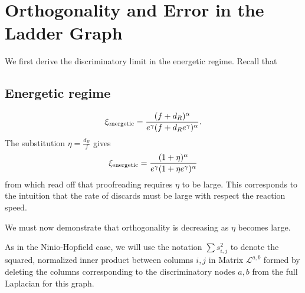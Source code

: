 \section{Orthogonality and Error in the Ladder Graph}
\label{app:ladder_orth}

We first derive the discriminatory limit in the energetic regime.  Recall that

\subsection{Energetic regime}
\[
\xi_{\rm energetic} = \frac{(f+d_R)^\alpha}{e^\gamma(f+d_Re^\gamma)^\alpha}.
\]
The substitution $\eta=\frac{d_R}{f}$ gives
\[
\xi_{\rm energetic} = \frac{(1+\eta)^\alpha}{e^\gamma(1+\eta e^\gamma)^\alpha}
\]
from which read off that proofreading requires $\eta$ to be large.  This corresponds to the intuition that the rate of discards must be large with respect the reaction speed.  

We must now demonstrate that orthogonality is decreasing as $\eta$ becomes large.


As in the Ninio-Hopfield case, we will use the notation $\sum{s^2_{i,j}}$ to denote the squared, normalized inner product between columns $i, j$ in Matrix $\mathcal{L}^{a,b}$ formed by deleting the columns corresponding to the discriminatory nodes $a, b$ from the full Laplacian for this graph.

